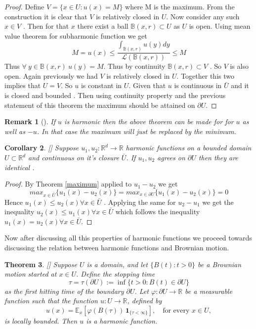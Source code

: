 \documentclass{article}
\numberwithin{equation}{section}
\newtheorem{theorem}{Theorem}[section]
\newtheorem{corollary}[theorem]{Corollary}
\newtheorem{remark}[theorem]{Remark}
\begin{document}
\begin{proof}
Define \(V =  \{x \in U : u(x)  = M\} \)  where M is the maximum. From the construction it is clear that \(V\) is relatively closed in \(U\). Now consider any such \(x \in V\) . Then for that \(x\) there exist a ball \( \mathbb{B}(x,r) \subset U\) as \(U \) is open. Using mean value theorem for subharmonic function we get \\
\[
M=u(x) \leq \frac{\int_{\mathbb{B}(x,r)} u(y)dy}{\mathscr{L}(\mathbb{B}(x,r))} \leq M
\]
Thus \( \forall\ y \in \mathbb{B}(x,r)\ u(y)=M\). Thus by continuity \(\mathbb{B}(x,r) \subset V\) . So \(V \) is also open. Again previously we had \(V\) is relatively closed in \(U\). Together this two implies that \(U=V\). So \(u\) is constant in \(U\).
\noindent Given that \(u\) is continuous in \(\bar{U}\) and it is closed and bounded . Then using continuity property and the previous statement of this theorem the maximum should be attained on \(\partial{U}\).
\end{proof}
\begin{remark}[{\cite[Remark 3.6]{PeresMortersBook}}]
If \(u\) is harmonic then the above theorem can be made for for \(u\) as well as \(-u\). In that case the maximum will just be replaced by the minimum.
\end{remark}
\begin{corollary}\label{unique}[{\cite[Corollary 3.7]{PeresMortersBook}}]
Suppose \( u_1,u_2 : \mathbb{R}^d \to \mathbb{R}\) harmonic functions on a bounded domain \(U \subset \mathbb{R}^d\) and continuous on it's closure \(\bar{U}\). If \(u_1,u_2\) agrees on \(\partial{U}\) then they are identical .
\end{corollary}
\begin{proof}
By Theorem \ref{maximum} applied to \(u_1 -u_2\) we get 
\[
max_{x\in \bar{U}}{\{u_1(x)-u_2(x)\}} = max_{x\in \partial{U}}{\{u_1(x)-u_2(x)\}} = 0 
\]
Hence \(u_1(x) \leq u_2(x) \forall x \in \bar{U}\) . Applying the same for \(u_2-u_1\) we get the inequality \(u_2(x) \leq u_1(x) \forall x \in \bar{U}\) which  follows the inequality \(u_1(x) = u_2(x) \forall x \in \bar{U}\).
\end{proof}
\noindent Now after discussing all this properties of harmonic functions we proceed towards discussing the relation between harmonic functions and Brownian motion.
\begin{theorem}\label{locally-bounded-harmonic-function}[{\cite[Theorem 3.8]{PeresMortersBook}}]
Suppose \( U \) is a domain, and let \( \{B(t): t > 0\} \) be a Brownian motion started at \( x \in U \). Define the stopping time
\[
\tau = \tau(\partial U) := \inf\{t > 0 : B(t) \in \partial U\}
\]
as the first hitting time of the boundary \( \partial U\). Let \( \varphi: \partial U \to \mathbb{R} \) be a measurable function such that the function \( u: U \to \mathbb{R} \), defined by
\[
u(x) = \mathbb{E}_x \left[ \varphi(B(\tau)) \, \mathbf{1}_{\{\tau < \infty\}} \right], \quad \text{for every } x \in U,
\]
is locally bounded. Then \( u \) is a harmonic function.

\end{theorem}
\end{document}
